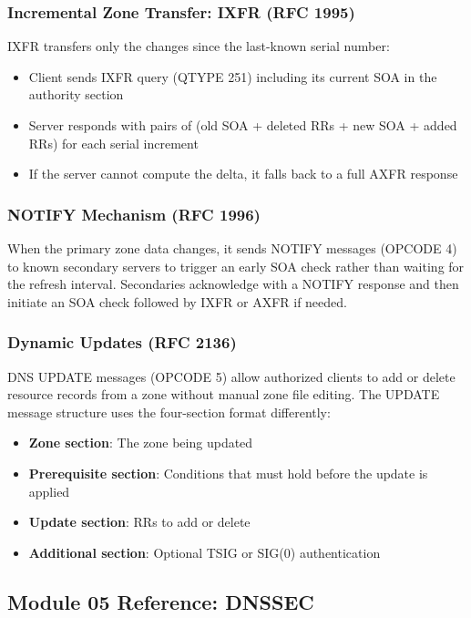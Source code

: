 \documentclass[11pt,letterpaper]{article}
\begin{document}
\subsubsection{Incremental Zone Transfer: IXFR (RFC 1995)}

IXFR transfers only the changes since the last-known serial number:
\begin{itemize}
  \item Client sends IXFR query (QTYPE 251) including its current SOA in the authority section
  \item Server responds with pairs of (old SOA + deleted RRs + new SOA + added RRs) for each serial increment
  \item If the server cannot compute the delta, it falls back to a full AXFR response
\end{itemize}

\subsubsection{NOTIFY Mechanism (RFC 1996)}

When the primary zone data changes, it sends NOTIFY messages (OPCODE 4) to known secondary servers to trigger an early SOA check rather than waiting for the refresh interval. Secondaries acknowledge with a NOTIFY response and then initiate an SOA check followed by IXFR or AXFR if needed.

\subsubsection{Dynamic Updates (RFC 2136)}

DNS UPDATE messages (OPCODE 5) allow authorized clients to add or delete resource records from a zone without manual zone file editing. The UPDATE message structure uses the four-section format differently:
\begin{itemize}
  \item \textbf{Zone section}: The zone being updated
  \item \textbf{Prerequisite section}: Conditions that must hold before the update is applied
  \item \textbf{Update section}: RRs to add or delete
  \item \textbf{Additional section}: Optional TSIG or SIG(0) authentication
\end{itemize}

\subsection{Module 05 Reference: DNSSEC}
\end{document}
